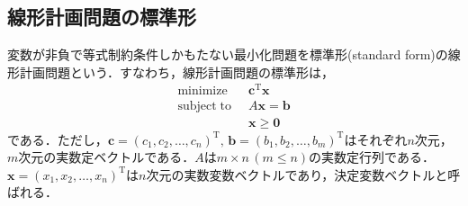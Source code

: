 \documentclass{jsreport}
\begin{document}
\subsection{線形計画問題の標準形}
変数が非負で等式制約条件しかもたない最小化問題を標準形(standard form)の線形計画問題という．すなわち，線形計画問題の標準形は，
\begin{align}\label{eq:standard}
  \mathrm{minimize} \; \; &\bm{c}^{\mathrm{T}}\bm{x} \nonumber \\
  \mathrm{subject \; to} \; \; &A\bm{x} = \bm{b} \\
  &\bm{x} \geq \bm{0} \nonumber
\end{align}
である．ただし，$\bm{c} = (c_1, c_2, \ldots, c_n)^{\mathrm{T}}, \, \bm{b} = (b_1, b_2, \ldots, b_m)^{\mathrm{T}}$はそれぞれ$n$次元，$m$次元の実数定ベクトルである．$A$は$m \times n \, (m \leq n)$の実数定行列である．$\bm{x} = (x_1, x_2, \ldots, x_n)^{\mathrm{T}}$は$n$次元の実数変数ベクトルであり，決定変数ベクトルと呼ばれる．
\end{document}

